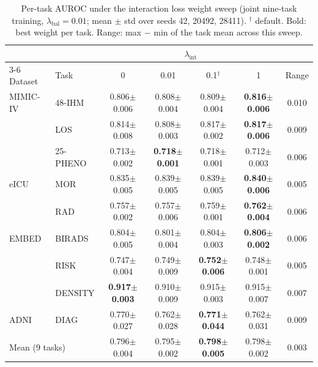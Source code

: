 \begin{table}[t]
\centering
\footnotesize
\setlength{\tabcolsep}{4pt}
\caption{Per-task AUROC under the interaction loss weight sweep (joint nine-task training, $\lambda_{\mathrm{bal}}=0.01$; mean $\pm$ std over seeds 42, 20492, 28411). $^\dagger$ default. Bold: best weight per task. Range: max $-$ min of the task mean across this sweep.}
\label{tab:aux-int-per-task}
\begin{tabular}{llccccc}
\toprule
 & & \multicolumn{4}{c}{$\lambda_{\mathrm{int}}$} & \\
\cmidrule(lr){3-6}
Dataset & Task & 0 & 0.01 & 0.1$^\dagger$ & 1 & Range \\
\midrule
MIMIC-IV & 48-IHM & 0.806{\scriptsize$\pm$0.006} & 0.808{\scriptsize$\pm$0.004} & 0.809{\scriptsize$\pm$0.004} & \textbf{0.816{\scriptsize$\pm$0.006}} & 0.010 \\
 & LOS & 0.814{\scriptsize$\pm$0.008} & 0.808{\scriptsize$\pm$0.003} & 0.817{\scriptsize$\pm$0.002} & \textbf{0.817{\scriptsize$\pm$0.006}} & 0.009 \\
 & 25-PHENO & 0.713{\scriptsize$\pm$0.002} & \textbf{0.718{\scriptsize$\pm$0.001}} & 0.718{\scriptsize$\pm$0.001} & 0.712{\scriptsize$\pm$0.003} & 0.006 \\
\addlinespace[2pt]
eICU & MOR & 0.835{\scriptsize$\pm$0.005} & 0.839{\scriptsize$\pm$0.005} & 0.839{\scriptsize$\pm$0.005} & \textbf{0.840{\scriptsize$\pm$0.006}} & 0.005 \\
 & RAD & 0.757{\scriptsize$\pm$0.002} & 0.757{\scriptsize$\pm$0.006} & 0.759{\scriptsize$\pm$0.001} & \textbf{0.762{\scriptsize$\pm$0.004}} & 0.006 \\
\addlinespace[2pt]
EMBED & BIRADS & 0.804{\scriptsize$\pm$0.005} & 0.801{\scriptsize$\pm$0.004} & 0.804{\scriptsize$\pm$0.003} & \textbf{0.806{\scriptsize$\pm$0.002}} & 0.006 \\
 & RISK & 0.747{\scriptsize$\pm$0.004} & 0.749{\scriptsize$\pm$0.009} & \textbf{0.752{\scriptsize$\pm$0.006}} & 0.748{\scriptsize$\pm$0.001} & 0.005 \\
 & DENSITY & \textbf{0.917{\scriptsize$\pm$0.003}} & 0.910{\scriptsize$\pm$0.009} & 0.915{\scriptsize$\pm$0.003} & 0.915{\scriptsize$\pm$0.007} & 0.007 \\
\addlinespace[2pt]
ADNI & DIAG & 0.770{\scriptsize$\pm$0.027} & 0.762{\scriptsize$\pm$0.028} & \textbf{0.771{\scriptsize$\pm$0.044}} & 0.762{\scriptsize$\pm$0.031} & 0.009 \\
\midrule
\multicolumn{2}{l}{Mean (9 tasks)} & 0.796{\scriptsize$\pm$0.004} & 0.795{\scriptsize$\pm$0.002} & \textbf{0.798{\scriptsize$\pm$0.005}} & 0.798{\scriptsize$\pm$0.002} & 0.003 \\
\bottomrule
\end{tabular}
\end{table}
